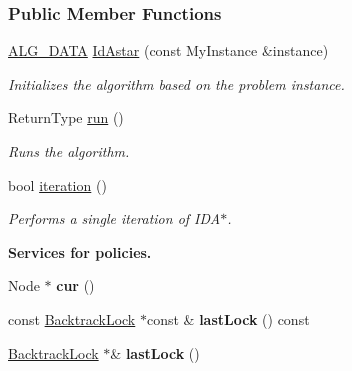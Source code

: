 \subsubsection*{Public Member Functions}
\begin{DoxyCompactItemize}
\item 
\hyperlink{algorithm_8h_a64c012078deee9a30405e18ec11e6360}{A\+L\+G\+\_\+\+D\+A\+TA} \hyperlink{structslb_1_1ext_1_1algorithm_1_1IdAstar_aa5859833358b03f49daed0c79dd50d5b}{Id\+Astar} (const My\+Instance \&instance)
\begin{DoxyCompactList}\small\item\em Initializes the algorithm based on the problem instance. \end{DoxyCompactList}\item 
Return\+Type \hyperlink{structslb_1_1ext_1_1algorithm_1_1IdAstar_a78f79f726453f63d509f05781d505874}{run} ()
\begin{DoxyCompactList}\small\item\em Runs the algorithm. \end{DoxyCompactList}\item 
bool \hyperlink{structslb_1_1ext_1_1algorithm_1_1IdAstar_a6f217097ffc1358b69381ff9d7064367}{iteration} ()
\begin{DoxyCompactList}\small\item\em Performs a single iteration of I\+D\+A$\ast$. \end{DoxyCompactList}\end{DoxyCompactItemize}
\begin{Indent}{\bf Services for policies.}\par
\begin{DoxyCompactItemize}
\item 
Node $\ast$ {\bfseries cur} ()\hypertarget{structslb_1_1ext_1_1algorithm_1_1IdAstar_ae8df24ec87b195293efee6bb04547b00}{}\label{structslb_1_1ext_1_1algorithm_1_1IdAstar_ae8df24ec87b195293efee6bb04547b00}

\item 
const \hyperlink{structslb_1_1ext_1_1algorithm_1_1IdAstar_a0337b9a42a8431c19a948905c996ee6c}{Backtrack\+Lock} $\ast$const \& {\bfseries last\+Lock} () const \hypertarget{structslb_1_1ext_1_1algorithm_1_1IdAstar_acef009e88e01b2fe9ed2f29dfd22a3e5}{}\label{structslb_1_1ext_1_1algorithm_1_1IdAstar_acef009e88e01b2fe9ed2f29dfd22a3e5}

\item 
\hyperlink{structslb_1_1ext_1_1algorithm_1_1IdAstar_a0337b9a42a8431c19a948905c996ee6c}{Backtrack\+Lock} $\ast$\& {\bfseries last\+Lock} ()\hypertarget{structslb_1_1ext_1_1algorithm_1_1IdAstar_ad0a5c5cda6b63d8f740c401646eac29b}{}\label{structslb_1_1ext_1_1algorithm_1_1IdAstar_ad0a5c5cda6b63d8f740c401646eac29b}

\end{DoxyCompactItemize}
\end{Indent}
